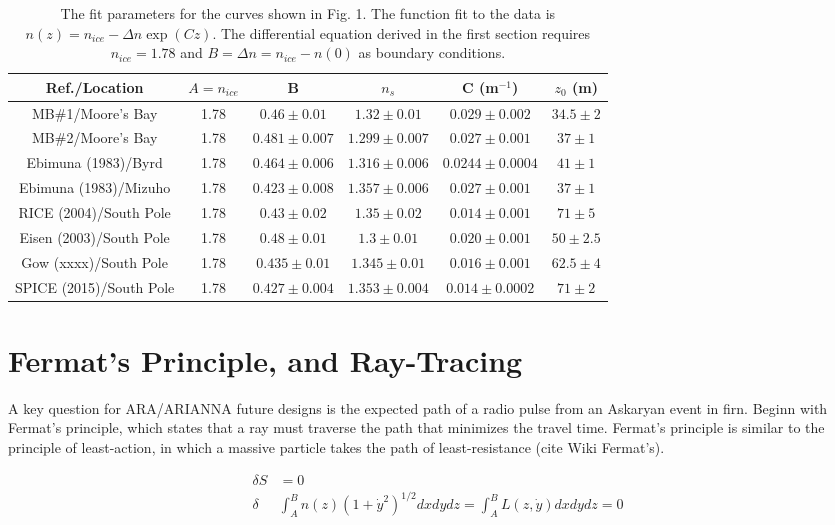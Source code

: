 \documentclass[12pt]{article}
\begin{document}
\begin{table}[ht]
\centering
\begin{tabular}{| c | c | c | c | c | c |}\hline
Ref./Location & $A=n_{ice}$ & B  & $n_s$ & C (m$^{-1}$) & $z_0$ (m)\\ \hline
MB\#1/Moore's Bay & 1.78 & $0.46\pm0.01$ & $1.32\pm0.01$ & $0.029\pm0.002$ & $34.5\pm2$ \\ \hline
MB\#2/Moore's Bay & 1.78 & $0.481\pm0.007$ & $1.299\pm0.007$ & $0.027\pm0.001$ & $37\pm1$ \\ \hline
Ebimuna (1983)/Byrd & 1.78 & $0.464\pm0.006$ & $1.316\pm0.006$ & $0.0244\pm0.0004$ & $41\pm1$ \\ \hline
Ebimuna (1983)/Mizuho & 1.78 & $0.423\pm0.008$ & $1.357\pm0.006$ & $0.027\pm0.001$ & $37\pm1$ \\ \hline\hline
RICE (2004)/South Pole & 1.78 & $0.43\pm0.02$ & $1.35\pm0.02$ & $0.014\pm0.001$ & $71\pm5$ \\ \hline
Eisen (2003)/South Pole & 1.78 & $0.48\pm0.01$ & $1.3\pm0.01$ & $0.020\pm0.001$ & $50\pm2.5$ \\ \hline
Gow (xxxx)/South Pole & 1.78 & $0.435\pm0.01$ & $1.345\pm0.01$ & $0.016\pm0.001$ & $62.5\pm4$ \\ \hline
SPICE (2015)/South Pole & 1.78 & $0.427\pm0.004$ & $1.353\pm0.004$ & $0.014\pm0.0002$ & $71\pm2$ \\ \hline
\end{tabular}
\caption{\label{tab:tab0} The fit parameters for the curves shown in Fig. 1.  The function fit to the data is $n(z) = n_{ice} -\Delta n \exp(Cz)$.  The differential equation derived in the first section requires $n_{ice} = 1.78$ and $B = \Delta n = n_{ice} - n(0)$ as boundary conditions.}
\end{table}

\section{Fermat's Principle, and Ray-Tracing}

A key question for ARA/ARIANNA future designs is the expected path of a radio pulse from an Askaryan event in firn.  Beginn with Fermat's principle, which states that a ray must traverse the path that minimizes the travel time.  Fermat's principle is similar to the principle of least-action, in which a massive particle takes the path of least-resistance (cite Wiki Fermat's).

\begin{align}
\delta S &= 0 \\
\delta &\int_A^B n(z)(1+\dot{y}^2)^{1/2} dx dy dz = \int_A^B L(z,\dot{y}) dx dy dz = 0
\end{align}
\end{document}
